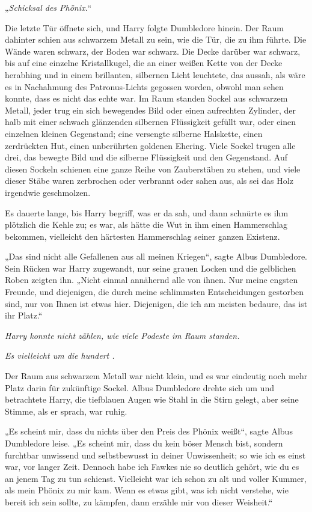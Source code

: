 {„\emph{Schicksal des Phönix.}“

Die letzte Tür öffnete sich, und Harry folgte Dumbledore hinein. Der Raum dahinter schien aus schwarzem Metall zu sein, wie die Tür, die zu ihm führte. Die Wände waren schwarz, der Boden war schwarz. Die Decke darüber war schwarz, bis auf eine einzelne Kristallkugel, die an einer weißen Kette von der Decke herabhing und in einem brillanten, silbernen Licht leuchtete, das aussah, als wäre es in Nachahmung des Patronus-Lichts gegossen worden, obwohl man sehen konnte, dass es nicht das echte war. Im Raum standen Sockel aus schwarzem Metall, jeder trug ein sich bewegendes Bild oder einen aufrechten Zylinder, der halb mit einer schwach glänzenden silbernen Flüssigkeit gefüllt war, oder einen einzelnen kleinen Gegenstand; eine versengte silberne Halskette, einen zerdrückten Hut, einen unberührten goldenen Ehering. Viele Sockel trugen alle drei, das bewegte Bild und die silberne Flüssigkeit und den Gegenstand. Auf diesen Sockeln schienen eine ganze Reihe von Zauberstäben zu stehen, und viele dieser Stäbe waren zerbrochen oder verbrannt oder sahen aus, als sei das Holz irgendwie geschmolzen.

Es dauerte lange, bis Harry begriff, was er da sah, und dann schnürte es ihm plötzlich die Kehle zu; es war, als hätte die Wut in ihm einen Hammerschlag bekommen, vielleicht den härtesten Hammerschlag seiner ganzen Existenz.

„Das sind nicht alle Gefallenen aus all meinen Kriegen“, sagte Albus Dumbledore. Sein Rücken war Harry zugewandt, nur seine grauen Locken und die gelblichen Roben zeigten ihn. „Nicht einmal annähernd alle von ihnen. Nur meine engsten Freunde, und diejenigen, die durch meine schlimmsten Entscheidungen gestorben sind, nur von Ihnen ist etwas hier. Diejenigen, die ich am meisten bedaure, das ist ihr Platz.“

\emph{Harry konnte nicht zählen, wie viele Podeste im Raum standen.}

\emph{Es vielleicht um die hundert .}

Der Raum aus schwarzem Metall war nicht klein, und es war eindeutig noch mehr Platz darin für zukünftige Sockel. Albus Dumbledore drehte sich um und betrachtete Harry, die tiefblauen Augen wie Stahl in die Stirn gelegt, aber seine Stimme, als er sprach, war ruhig.

„Es scheint mir, dass du nichts über den Preis des Phönix weißt“, sagte Albus Dumbledore leise. „Es scheint mir, dass du kein böser Mensch bist, sondern furchtbar unwissend und selbstbewusst in deiner Unwissenheit; so wie ich es einst war, vor langer Zeit. Dennoch habe ich Fawkes nie so deutlich gehört, wie du es an jenem Tag zu tun schienst. Vielleicht war ich schon zu alt und voller Kummer, als mein Phönix zu mir kam. Wenn es etwas gibt, was ich nicht verstehe, wie bereit ich sein sollte, zu kämpfen, dann erzähle mir von dieser Weisheit.“

}
